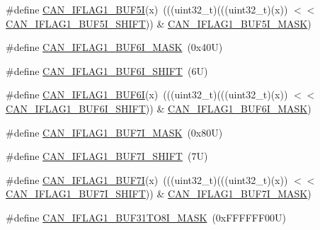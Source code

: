 \begin{DoxyCompactItemize}
\item 
\#define \mbox{\hyperlink{group___c_a_n___register___masks_ga5a9fd5d18422f31b59b1b5cdc983ea88}{C\+A\+N\+\_\+\+I\+F\+L\+A\+G1\+\_\+\+B\+U\+F5I}}(x)~(((uint32\+\_\+t)(((uint32\+\_\+t)(x)) $<$$<$ \mbox{\hyperlink{group___c_a_n___register___masks_ga4eef45eb97993797f0e4d25d84ae98ae}{C\+A\+N\+\_\+\+I\+F\+L\+A\+G1\+\_\+\+B\+U\+F5\+I\+\_\+\+S\+H\+I\+FT}})) \& \mbox{\hyperlink{group___c_a_n___register___masks_ga5ba2a22d90a915a0504e74e0be2ae46e}{C\+A\+N\+\_\+\+I\+F\+L\+A\+G1\+\_\+\+B\+U\+F5\+I\+\_\+\+M\+A\+SK}})
\item 
\#define \mbox{\hyperlink{group___c_a_n___register___masks_ga0aec3c62d96f6f8e8afd046065838df7}{C\+A\+N\+\_\+\+I\+F\+L\+A\+G1\+\_\+\+B\+U\+F6\+I\+\_\+\+M\+A\+SK}}~(0x40\+U)
\item 
\#define \mbox{\hyperlink{group___c_a_n___register___masks_gac3a088607f853fdddfc0011293e1c336}{C\+A\+N\+\_\+\+I\+F\+L\+A\+G1\+\_\+\+B\+U\+F6\+I\+\_\+\+S\+H\+I\+FT}}~(6\+U)
\item 
\#define \mbox{\hyperlink{group___c_a_n___register___masks_ga86b673924b7eb5e2556b6adbff6070fd}{C\+A\+N\+\_\+\+I\+F\+L\+A\+G1\+\_\+\+B\+U\+F6I}}(x)~(((uint32\+\_\+t)(((uint32\+\_\+t)(x)) $<$$<$ \mbox{\hyperlink{group___c_a_n___register___masks_gac3a088607f853fdddfc0011293e1c336}{C\+A\+N\+\_\+\+I\+F\+L\+A\+G1\+\_\+\+B\+U\+F6\+I\+\_\+\+S\+H\+I\+FT}})) \& \mbox{\hyperlink{group___c_a_n___register___masks_ga0aec3c62d96f6f8e8afd046065838df7}{C\+A\+N\+\_\+\+I\+F\+L\+A\+G1\+\_\+\+B\+U\+F6\+I\+\_\+\+M\+A\+SK}})
\item 
\#define \mbox{\hyperlink{group___c_a_n___register___masks_gacc148d0c9e26a80f08110dc2c5045809}{C\+A\+N\+\_\+\+I\+F\+L\+A\+G1\+\_\+\+B\+U\+F7\+I\+\_\+\+M\+A\+SK}}~(0x80\+U)
\item 
\#define \mbox{\hyperlink{group___c_a_n___register___masks_ga327609a9678df5c8c34053d43b550422}{C\+A\+N\+\_\+\+I\+F\+L\+A\+G1\+\_\+\+B\+U\+F7\+I\+\_\+\+S\+H\+I\+FT}}~(7\+U)
\item 
\#define \mbox{\hyperlink{group___c_a_n___register___masks_ga473442743e68ba79c0e1fb04562c174d}{C\+A\+N\+\_\+\+I\+F\+L\+A\+G1\+\_\+\+B\+U\+F7I}}(x)~(((uint32\+\_\+t)(((uint32\+\_\+t)(x)) $<$$<$ \mbox{\hyperlink{group___c_a_n___register___masks_ga327609a9678df5c8c34053d43b550422}{C\+A\+N\+\_\+\+I\+F\+L\+A\+G1\+\_\+\+B\+U\+F7\+I\+\_\+\+S\+H\+I\+FT}})) \& \mbox{\hyperlink{group___c_a_n___register___masks_gacc148d0c9e26a80f08110dc2c5045809}{C\+A\+N\+\_\+\+I\+F\+L\+A\+G1\+\_\+\+B\+U\+F7\+I\+\_\+\+M\+A\+SK}})
\item 
\#define \mbox{\hyperlink{group___c_a_n___register___masks_ga70c705b79c7bd7451ebdee6bc0ba6f1c}{C\+A\+N\+\_\+\+I\+F\+L\+A\+G1\+\_\+\+B\+U\+F31\+T\+O8\+I\+\_\+\+M\+A\+SK}}~(0x\+F\+F\+F\+F\+F\+F00\+U)
$$
\end{DoxyCompactItemize}
